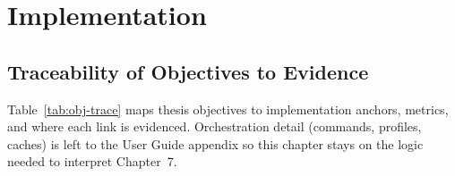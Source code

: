 \chapter{Implementation}
\label{ch:implementation}

\section{Traceability of Objectives to Evidence}

Table~\ref{tab:obj-trace} maps thesis objectives to implementation anchors, metrics, and where each link is evidenced. Orchestration detail (commands, profiles, caches) is left to the User Guide appendix so this chapter stays on the logic needed to interpret Chapter~7.

